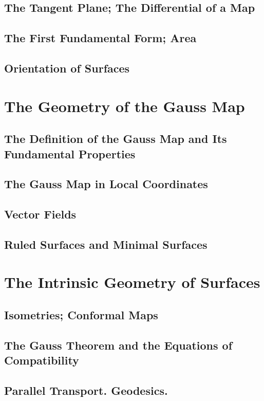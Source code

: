 \documentclass[oneside]{amsbook}
\numberwithin{ex}{section}
\begin{document}
\section{The Tangent Plane; The Differential of a Map}

\section{The First Fundamental Form; Area}

\section{Orientation of Surfaces}


\chapter{The Geometry of the Gauss Map}
\setcounter{section}{1}
\section{The Definition of the Gauss Map and Its Fundamental Properties}

\section{The Gauss Map in Local Coordinates}

\section{Vector Fields}

\section{Ruled Surfaces and Minimal Surfaces}


\chapter{The Intrinsic Geometry of Surfaces}
\setcounter{section}{1}
\section{Isometries; Conformal Maps}

\section{The Gauss Theorem and the Equations of Compatibility}

\section{Parallel Transport. Geodesics.}

\end{document}
